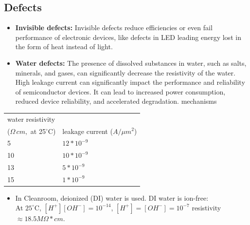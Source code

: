 \documentclass[10pt,a4paper]{ctexart}
\newcommand{\key}[1]{\textbf{#1}}
\begin{document}
\begin{multicols*}{3}
\subsection{Defects}
\begin{itemize}
  \item \key{Invisible defects:} Invisible defects reduce efficiencies or even fail performance of electronic devices, 
  like defects in LED leading energy lost in the form of heat instead of light.
  \item \key{Water defects:} The presence of dissolved substances in water, such as salts, minerals, 
  and gases, can significantly decrease the resistivity of the water.\\
  High leakage current can significantly impact the performance and reliability of semiconductor devices. 
  It can lead to increased power consumption, reduced device reliability, and accelerated degradation.
mechanisms
\end{itemize}

\begin{center}\footnotesize
\begin{tabularx}{\linewidth}{@{}lY@{}}
\toprule
water resistivity \\ ($\Omega\,cm,$ at 25$^\circ$C) & leakage current ($A/\mu m^2$)\\
 & $12*10^{-9}$\\
10 & $10*10^{-9}$\\
13 & $5*10^{-9}$\\
15 & $1*10^{-9}$\\
\bottomrule
\end{tabularx}
\end{center}

\begin{itemize}
  \item In Cleanroom, deionized (DI) water is used. DI water is ion-free: \\
  At $25^\circ$C, $[H^+][OH^-]=10^{-14}$, $[H^+]=[OH^-]=10^{-7}$ 
  resistivity $\approx18.5M\Omega*cm$.
\end{itemize}



\end{multicols*}
\end{document}
